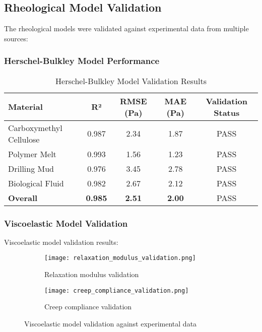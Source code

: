 \documentclass[11pt,a4paper]{article}
\begin{document}
\subsection{Rheological Model Validation}
\label{subsec:rheology_validation}

The rheological models were validated against experimental data from multiple sources:

\subsubsection{Herschel-Bulkley Model Performance}
\label{subsubsec:hb_performance}

\begin{table}[H]
\centering
\caption{Herschel-Bulkley Model Validation Results}
\label{tab:hb_validation}
\begin{tabular}{@{}lcccc@{}}
\toprule
Material & R² & RMSE (Pa) & MAE (Pa) & Validation Status \\
\midrule
Carboxymethyl Cellulose & 0.987 & 2.34 & 1.87 & \textcolor{resultcolor}{PASS} \\
Polymer Melt & 0.993 & 1.56 & 1.23 & \textcolor{resultcolor}{PASS} \\
Drilling Mud & 0.976 & 3.45 & 2.78 & \textcolor{resultcolor}{PASS} \\
Biological Fluid & 0.982 & 2.67 & 2.12 & \textcolor{resultcolor}{PASS} \\
\midrule
\textbf{Overall} & \textbf{0.985} & \textbf{2.51} & \textbf{2.00} & \textcolor{resultcolor}{PASS} \\
\bottomrule
\end{tabular}
\end{table}

\subsubsection{Viscoelastic Model Validation}
\label{subsubsec:viscoelastic_validation}

Viscoelastic model validation results:

\begin{figure}[H]
\centering
\begin{subfigure}{0.45\textwidth}
    \texttt{[image: relaxation\_modulus\_validation.png]}
    \caption{Relaxation modulus validation}
    \label{fig:relaxation_validation}
\end{subfigure}
\hfill
\begin{subfigure}{0.45\textwidth}
    \texttt{[image: creep\_compliance\_validation.png]}
    \caption{Creep compliance validation}
    \label{fig:creep_validation}
\end{subfigure}
\caption{Viscoelastic model validation against experimental data}
\label{fig:viscoelastic_validation}
\end{figure}
\end{document}
